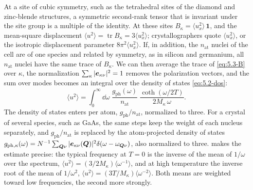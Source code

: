 At a site of cubic symmetry, such as the tetrahedral sites of the diamond and zinc-blende structures, a symmetric second-rank tensor that is invariant under the site group is a multiple of the identity. At these sites $B_\kappa = \langle u_x^2\rangle\,\mathbf{1}$, and the mean-square displacement $\langle u^2\rangle = \operatorname{tr}B_\kappa = 3\langle u_x^2\rangle$; crystallographers quote $\langle u_x^2\rangle$, or the isotropic displacement parameter $8\pi^2\langle u_x^2\rangle$. If, in addition, the $n_{\mathrm{at}}$ nuclei of the cell are of one species and related by symmetry, as in silicon and germanium, all $n_{\mathrm{at}}$ nuclei have the same trace of $B_\kappa$. We can then average the trace of \cref{eq:5.3-B} over $\kappa$, the normalization $\sum_\kappa|\bm{e}_{\kappa\nu}|^2 = 1$ removes the polarization vectors, and the sum over modes becomes an integral over the density of states \cref{eq:5.2-dos}:
\begin{equation}
  \langle u^2\rangle = \int_0^\infty\dd\omega\;\frac{g_{\mathrm{ph}}(\omega)}{n_{\mathrm{at}}}\;\frac{\coth(\omega/2T)}{2M_\kappa\,\omega} .
  \label{eq:5.3-u2}
\end{equation}
The density of states enters per atom, $g_{\mathrm{ph}}/n_{\mathrm{at}}$, normalized to three. For a crystal of several species, such as GaAs, the same steps keep the weight of each nucleus separately, and $g_{\mathrm{ph}}/n_{\mathrm{at}}$ is replaced by the atom-projected density of states $g_{\mathrm{ph},\kappa}(\omega) = N^{-1}\sum_{\bm{Q}\nu}|\bm{e}_{\kappa\nu}(\bm{Q})|^2\delta(\omega - \omega_{\bm{Q}\nu})$, also normalized to three.  makes the estimate precise: the typical frequency at $T = 0$ is the inverse of the mean of $1/\omega$ over the spectrum, $\langle u^2\rangle = (3/2M_\kappa)\langle\omega^{-1}\rangle$, and at high temperature the inverse root of the mean of $1/\omega^2$, $\langle u^2\rangle = (3T/M_\kappa)\langle\omega^{-2}\rangle$. Both means are weighted toward low frequencies, the second more strongly.

